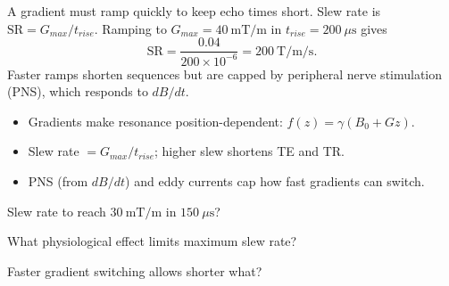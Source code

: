 \begin{workedexample}
A gradient must ramp quickly to keep echo times short. Slew rate is
$\text{SR} = G_{max}/t_{rise}$. Ramping to $G_{max} = 40\ \text{mT/m}$ in
$t_{rise} = 200\ \mu\text{s}$ gives
\[ \text{SR} = \frac{0.04}{200\times10^{-6}} = 200\ \text{T/m/s}. \]
Faster ramps shorten sequences but are capped by peripheral nerve stimulation
(PNS), which responds to $dB/dt$.
\end{workedexample}

\begin{keytakeaways}
\begin{itemize}[leftmargin=1.4em,itemsep=2pt]
\item Gradients make resonance position-dependent: $f(z) = \gamma(B_0 + Gz)$.
\item Slew rate $= G_{max}/t_{rise}$; higher slew shortens TE and TR.
\item PNS (from $dB/dt$) and eddy currents cap how fast gradients can switch.
\end{itemize}
\end{keytakeaways}

\begin{exercises}
\item Slew rate to reach $30\ \text{mT/m}$ in $150\ \mu\text{s}$?
\item What physiological effect limits maximum slew rate?
\item Faster gradient switching allows shorter what?
\end{exercises}

